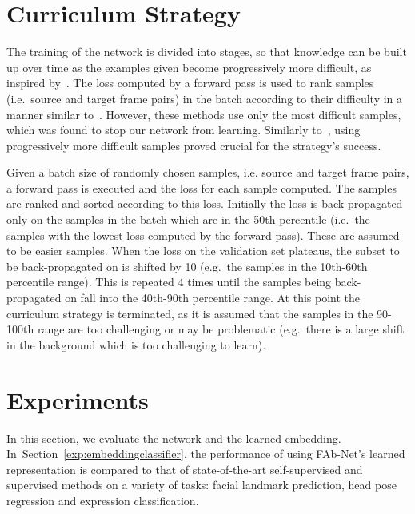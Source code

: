 \documentclass{bmvc2k}
\newcommand{\secref}[1]{Section~\ref{#1}}
\def\networkname{FAb-Net}
\begin{document}
\section{Curriculum Strategy}
\label{sec:curriculum}
The training of the network is divided into stages, so that knowledge can be built up over time as the examples given become progressively more difficult, as inspired by~\cite{bengio2009curriculum,Kumar10ours}. 
The loss computed by a forward pass is used to rank samples (i.e.~source and target frame pairs) in the batch according to their difficulty in a manner similar to~\cite{loshchilov2015online,simo2015discriminative,shrivastava2016training,nagrani2018learnable}.
However, these methods use only the most difficult samples, which was found to stop our network from learning. 
Similarly to~\cite{nagrani2018learnable}, using progressively more difficult samples proved crucial for the strategy's success. 




Given a batch size of  randomly chosen samples, i.e. source and target frame pairs, a forward pass is executed and the loss for each sample computed.
The samples are ranked and sorted according to this loss.
Initially the loss is back-propagated only on the samples in the batch which are in the 50th percentile (i.e.~the  samples with the lowest loss computed by the forward pass). These are assumed to be easier samples.
When the loss on the validation set plateaus, the subset to be back-propagated on is shifted by 10 (e.g.~the samples in the 10th-60th percentile range).
This is repeated 4 times until the samples being back-propagated on fall into the 40th-90th percentile range.
At this point the curriculum strategy is terminated, as it is assumed that the samples in the 90-100th range are too challenging or may be problematic (e.g.~there is a large shift in the background which is too challenging to learn).


\section{Experiments}\label{sec:experiments}

In this section, we evaluate the network and the learned embedding. In~\secref{exp:embeddingclassifier}, the performance of using \networkname's learned representation is compared to that of state-of-the-art self-supervised and supervised methods on a variety of tasks: facial landmark prediction, head pose regression and expression classification.
\end{document}
